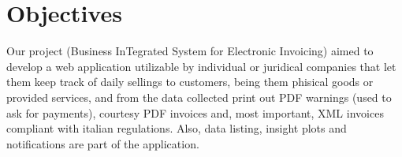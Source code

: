 \section{Objectives}


Our project (Business InTegrated System for Electronic Invoicing) aimed to develop a web application utilizable by individual or juridical companies that let them keep track of daily sellings to customers, being them phisical goods or provided services, and from the data collected print out PDF warnings (used to ask for payments), courtesy PDF invoices and, most important, XML invoices compliant with italian regulations. Also, data listing, insight plots and notifications are part of the application.